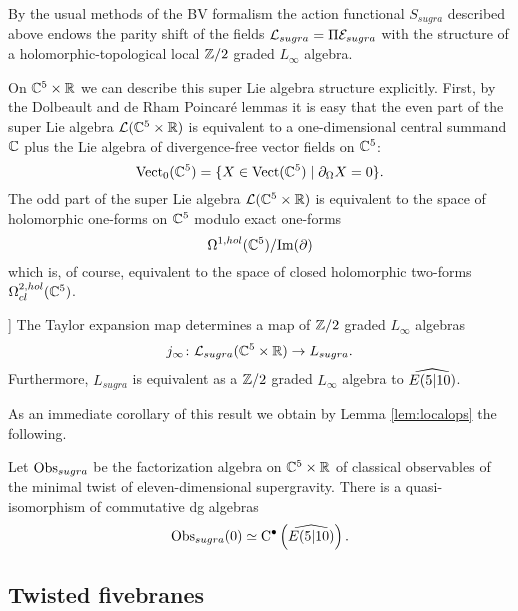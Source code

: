 \documentclass[11pt]{amsart}
\begin{document}
\parsec[s:sugraobs]

By the usual methods of the BV formalism the action functional $S_{sugra}$ described above endows the parity shift of the fields $\cL_{sugra} = \Pi \cE_{sugra}$ with the structure of a holomorphic-topological local $\Z/2$ graded $L_\infty$ algebra. 

On $\C^5 \times \R$ we can describe this super Lie algebra structure explicitly. 
First, by the Dolbeault and de Rham Poincar\'e lemmas it is easy that the even part of the super Lie algebra $\cL(\C^5 \times \R)$ is equivalent to a one-dimensional central summand $\C$ plus the Lie algebra of divergence-free vector fields on $\C^5$:
\[
\Vect_0 (\C^5) = \{X \in \Vect(\C^5) \; | \; \div X = 0\} .
\]
The odd part of the super Lie algebra $\cL(\C^5 \times \R)$ is equivalent to the space of holomorphic one-forms on $\C^5$ modulo exact one-forms
\[
\Omega^{1,hol}(\C^5) / {\rm Im}(\del) 
\]
which is, of course, equivalent to the space of closed holomorphic two-forms $\Omega^{2,hol}_{cl}(\C^5)$. 

\begin{thm}[\cite{RSW}[Theorem 2.1]]
The Taylor expansion map determines a map of $\Z/2$ graded $L_\infty$ algebras
\[
j_\infty \colon \cL_{sugra}(\C^5 \times \R) \to L_{sugra} .
\]
Furthermore, $L_{sugra}$ is equivalent as a $\Z/2$ graded $L_\infty$ algebra to $\Hat{E(5|10)}$. 
\end{thm} 

As an immediate corollary of this result we obtain by Lemma \ref{lem:localops} the following.

\begin{cor}
Let $\Obs_{sugra}$ be the factorization algebra on $\C^5 \times \R$ of classical observables of the minimal twist of eleven-dimensional supergravity.
There is a quasi-isomorphism of commutative dg algebras
\[
\Obs_{sugra} (0) \simeq \clie^\bu \left( \Hat{E(5|10)} \right) .
\]
\end{cor}


\subsection{Twisted fivebranes} 


\parsec[s:coupling]

\parsec[s:single]
\end{document}
